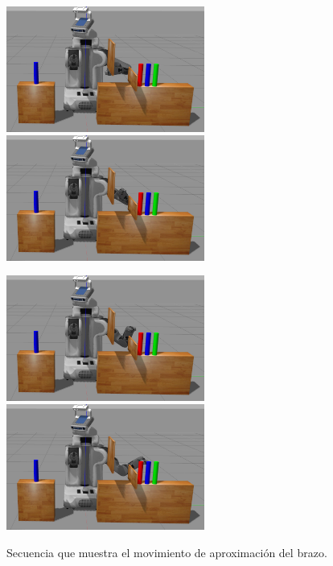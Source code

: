 \documentclass[12pt,spanish,chapterprefix, numbers=noenddot]{book}
\numberwithin{equation}{section}
\numberwithin{figure}{section}
\begin{document}
\begin{figure}[hbt!]
\centering
\includegraphics[width=6.5cm]{Figs/frame1632.png}
\includegraphics[width=6.5cm]{Figs/frame1692.png}
\par
\centering
\includegraphics[width=6.5cm]{Figs/frame1791.png}
\includegraphics[width=6.5cm]{Figs/frame1910.png}
\par
\caption{\label{fig:fase4}Secuencia que muestra el movimiento de aproximación del brazo.}
\end{figure}
\end{document}

